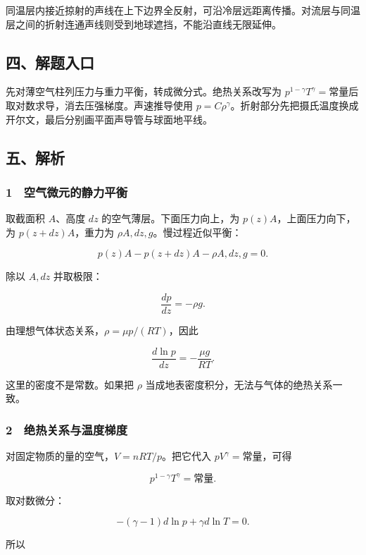 \documentclass[12pt,a4paper,fontset=fandol]{ctexart}
\begin{document}
同温层内接近掠射的声线在上下边界全反射，可沿冷层远距离传播。对流层与同温层之间的折射连通声线则受到地球遮挡，不能沿直线无限延伸。

\subsection{四、解题入口}\label{ux56dbux89e3ux9898ux5165ux53e3-6}

先对薄空气柱列压力与重力平衡，转成微分式。绝热关系改写为
\(p^{1-\gamma}T^\gamma=\)常量后取对数求导，消去压强梯度。声速推导使用
\(p=C\rho^\gamma\)。折射部分先把摄氏温度换成开尔文，最后分别画平面声导管与球面地平线。

\subsection{五、解析}\label{ux4e94ux89e3ux6790-6}

\subsubsection{1　空气微元的静力平衡}\label{ux7a7aux6c14ux5faeux5143ux7684ux9759ux529bux5e73ux8861}

取截面积 \(A\)、高度 \(dz\) 的空气薄层。下面压力向上，为
\(p(z)A\)，上面压力向下，为 \(p(z+dz)A\)，重力为
\(\rho A,dz,g\)。慢过程近似平衡：

\[p(z)A-p(z+dz)A-\rho A,dz,g=0.\]

除以 \(A,dz\) 并取极限：

\[\boxed{\frac{dp}{dz}=-\rho g.}\]

由理想气体状态关系，\(\rho=\mu p/(RT)\)，因此

\[\boxed{\frac{d\ln p}{dz}=-\frac{\mu g}{RT}.}\]

这里的密度不是常数。如果把 \(\rho\)
当成地表密度积分，无法与气体的绝热关系一致。

\subsubsection{2　绝热关系与温度梯度}\label{ux7eddux70edux5173ux7cfbux4e0eux6e29ux5ea6ux68afux5ea6}

对固定物质的量的空气，\(V=nRT/p\)。把它代入 \(pV^\gamma=\)常量，可得

\[p^{1-\gamma}T^\gamma=\text{常量}.\]

取对数微分：

\[-(\gamma-1)d\ln p+\gamma d\ln T=0.\]

所以
\end{document}
